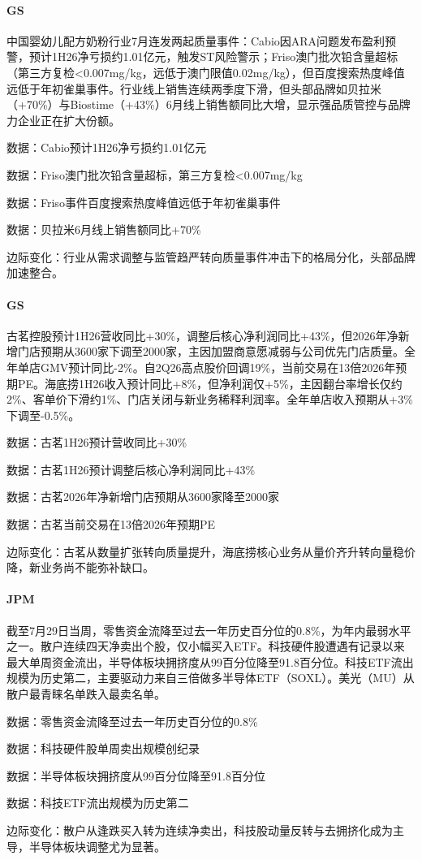 \documentclass[11pt]{ctexart}
\begin{document}
\paragraph{GS} 中国婴幼儿配方奶粉行业7月连发两起质量事件：Cabio因ARA问题发布盈利预警，预计1H26净亏损约1.01亿元，触发ST风险警示；Friso澳门批次铅含量超标（第三方复检<0.007mg/kg，远低于澳门限值0.02mg/kg），但百度搜索热度峰值远低于年初雀巢事件。行业线上销售连续两季度下滑，但头部品牌如贝拉米（+70\%）与Biostime（+43\%）6月线上销售额同比大增，显示强品质管控与品牌力企业正在扩大份额。
{\small\color{refgray}数据：Cabio预计1H26净亏损约1.01亿元\par}
{\small\color{refgray}数据：Friso澳门批次铅含量超标，第三方复检<0.007mg/kg\par}
{\small\color{refgray}数据：Friso事件百度搜索热度峰值远低于年初雀巢事件\par}
{\small\color{refgray}数据：贝拉米6月线上销售额同比+70\%\par}
{\small\color{refgray}边际变化：行业从需求调整与监管趋严转向质量事件冲击下的格局分化，头部品牌加速整合。\par}
\paragraph{GS} 古茗控股预计1H26营收同比+30\%，调整后核心净利润同比+43\%，但2026年净新增门店预期从3600家下调至2000家，主因加盟商意愿减弱与公司优先门店质量。全年单店GMV预计同比-2\%。自2Q26高点股价回调19\%，当前交易在13倍2026年预期PE。海底捞1H26收入预计同比+8\%，但净利润仅+5\%，主因翻台率增长仅约2\%、客单价下滑约1\%、门店关闭与新业务稀释利润率。全年单店收入预期从+3\%下调至-0.5\%。
{\small\color{refgray}数据：古茗1H26预计营收同比+30\%\par}
{\small\color{refgray}数据：古茗1H26预计调整后核心净利润同比+43\%\par}
{\small\color{refgray}数据：古茗2026年净新增门店预期从3600家降至2000家\par}
{\small\color{refgray}数据：古茗当前交易在13倍2026年预期PE\par}
{\small\color{refgray}边际变化：古茗从数量扩张转向质量提升，海底捞核心业务从量价齐升转向量稳价降，新业务尚不能弥补缺口。\par}
\paragraph{JPM} 截至7月29日当周，零售资金流降至过去一年历史百分位的0.8\%，为年内最弱水平之一。散户连续四天净卖出个股，仅小幅买入ETF。科技硬件股遭遇有记录以来最大单周资金流出，半导体板块拥挤度从99百分位降至91.8百分位。科技ETF流出规模为历史第二，主要驱动力来自三倍做多半导体ETF（SOXL）。美光（MU）从散户最青睐名单跌入最卖名单。
{\small\color{refgray}数据：零售资金流降至过去一年历史百分位的0.8\%\par}
{\small\color{refgray}数据：科技硬件股单周卖出规模创纪录\par}
{\small\color{refgray}数据：半导体板块拥挤度从99百分位降至91.8百分位\par}
{\small\color{refgray}数据：科技ETF流出规模为历史第二\par}
{\small\color{refgray}边际变化：散户从逢跌买入转为连续净卖出，科技股动量反转与去拥挤化成为主导，半导体板块调整尤为显著。\par}
\end{document}
